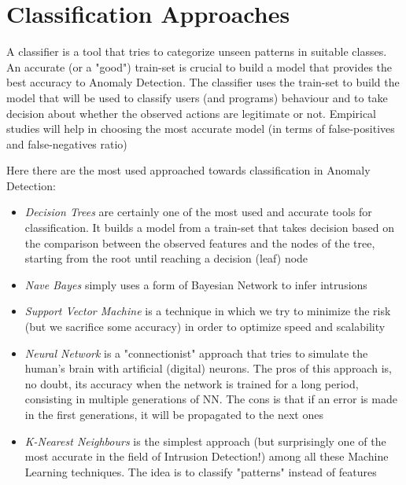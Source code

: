 \chapter{Classification Approaches}

A classifier is a tool that tries to categorize unseen patterns in suitable classes.\newline
An accurate (or a "good") train-set is crucial to build a model that provides the best accuracy to Anomaly Detection.\newline
The classifier uses the train-set to build the model that will be used to classify users (and programs) behaviour and to take decision about whether the observed actions are legitimate or not. Empirical studies will help in choosing the most accurate model (in terms of false-positives and false-negatives ratio)\newline\newline

Here there are the most used approached towards classification in Anomaly Detection:

\begin{itemize}
	\item \emph{Decision Trees} are certainly one of the most used and accurate tools for classification. It builds a model from a train-set that takes decision based on the comparison between the observed features and the nodes of the tree, starting from the root until reaching a decision (leaf) node
	\vspace{0.3cm}
	\item \emph{Nave Bayes} simply uses a form of Bayesian Network to infer intrusions
	\vspace{0.3cm}
	\item \emph{Support Vector Machine} is a technique in which we try to minimize the risk (but we sacrifice some accuracy) in order to optimize speed and scalability
	\vspace{0.3cm}
	\item \emph{Neural Network} is a "connectionist" approach that tries to simulate the human's brain with artificial (digital) neurons. The pros of this approach is, no doubt, its accuracy when the network is trained for a long period, consisting in multiple generations of NN. The cons is that if an error is made in the first generations, it will be propagated to the next ones
	\vspace{0.3cm}
	\item \emph{K-Nearest Neighbours} is the simplest approach (but surprisingly one of the most accurate in the field of Intrusion Detection!) among all these Machine Learning techniques. The idea is to classify "patterns" instead of features
\end{itemize}

